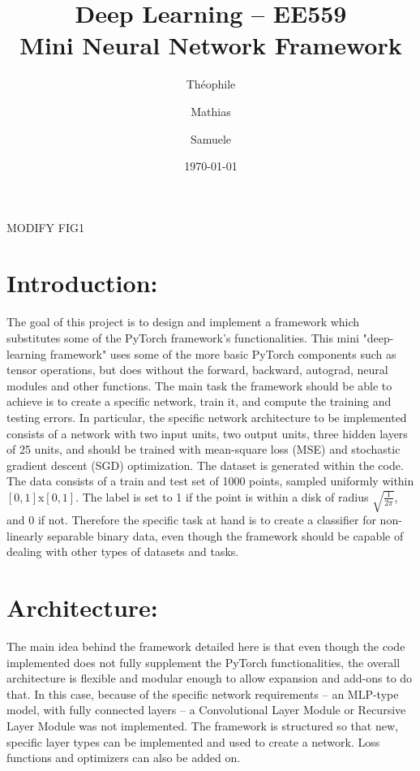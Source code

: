 \documentclass[10pt, a4paper]{article}
\begin{document}
\title{\large{\textbf{Deep Learning -- EE559 \\ Mini Neural Network Framework}}}
\date{\normalsize{\today}}
\author{\normalsize{Th\' eophile 	} \and \normalsize{Mathias } \and \normalsize{Samuele }}
\maketitle
MODIFY FIG1
\section{Introduction:} 
The goal of this project is to design and implement a framework which substitutes some of the PyTorch framework's functionalities. This mini "deep-learning framework" uses some of the more basic PyTorch components such as tensor operations, but does without the forward, backward, autograd, neural modules and other functions. 
The main task the framework should be able to achieve is to create a specific network, train it, and compute the training and testing errors.
In particular, the specific network architecture to be implemented consists of a network with two input units, two output units, three hidden layers of 25 units, and should be trained with mean-square loss (MSE) and stochastic gradient descent (SGD) optimization.
The dataset is generated within the code. The data consists of a train and test set of 1000 points, sampled uniformly within $[0,1]$x$[0,1]$. The label is set to 1 if the point is within a disk of radius $\sqrt{\frac{1}{2\pi}}$, and 0 if not. Therefore the specific task at hand is to create a classifier for non-linearly separable binary data, even though the framework should be capable of dealing with other types of datasets and tasks.
	
\section{Architecture:}The main idea behind the framework detailed here is that even though the code implemented does not fully supplement the PyTorch functionalities, the overall architecture is flexible and modular enough to allow expansion and add-ons to do that. In this case, because of 	the specific network requirements -- an MLP-type model, with fully connected layers -- a Convolutional Layer Module or Recursive Layer Module was not implemented. The framework is structured so that new, specific layer types can be implemented and used to create a network. Loss functions and optimizers can also be added on.
\end{document}
